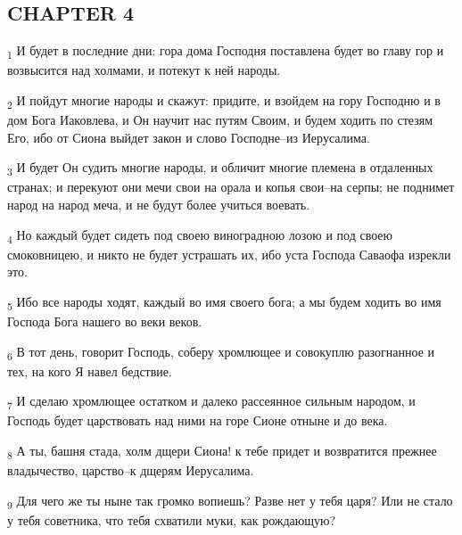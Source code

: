 \subsection{CHAPTER 4}
\begin{tcolorbox}
\textsubscript{1} И будет в последние дни: гора дома Господня поставлена будет во главу гор и возвысится над холмами, и потекут к ней народы.
\end{tcolorbox}
\begin{tcolorbox}
\textsubscript{2} И пойдут многие народы и скажут: придите, и взойдем на гору Господню и в дом Бога Иаковлева, и Он научит нас путям Своим, и будем ходить по стезям Его, ибо от Сиона выйдет закон и слово Господне--из Иерусалима.
\end{tcolorbox}
\begin{tcolorbox}
\textsubscript{3} И будет Он судить многие народы, и обличит многие племена в отдаленных странах; и перекуют они мечи свои на орала и копья свои--на серпы; не поднимет народ на народ меча, и не будут более учиться воевать.
\end{tcolorbox}
\begin{tcolorbox}
\textsubscript{4} Но каждый будет сидеть под своею виноградною лозою и под своею смоковницею, и никто не будет устрашать их, ибо уста Господа Саваофа изрекли это.
\end{tcolorbox}
\begin{tcolorbox}
\textsubscript{5} Ибо все народы ходят, каждый во имя своего бога; а мы будем ходить во имя Господа Бога нашего во веки веков.
\end{tcolorbox}
\begin{tcolorbox}
\textsubscript{6} В тот день, говорит Господь, соберу хромлющее и совокуплю разогнанное и тех, на кого Я навел бедствие.
\end{tcolorbox}
\begin{tcolorbox}
\textsubscript{7} И сделаю хромлющее остатком и далеко рассеянное сильным народом, и Господь будет царствовать над ними на горе Сионе отныне и до века.
\end{tcolorbox}
\begin{tcolorbox}
\textsubscript{8} А ты, башня стада, холм дщери Сиона! к тебе придет и возвратится прежнее владычество, царство--к дщерям Иерусалима.
\end{tcolorbox}
\begin{tcolorbox}
\textsubscript{9} Для чего же ты ныне так громко вопиешь? Разве нет у тебя царя? Или не стало у тебя советника, что тебя схватили муки, как рождающую?
\end{tcolorbox}
